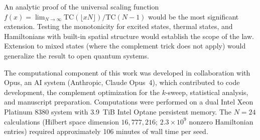 \documentclass[aps,pra,twocolumn,superscriptaddress,floatfix]{revtex4-2}
\begin{document}
An analytic proof of the universal scaling function $f(x) = \lim_{N\to\infty} \mathrm{TC}(\lfloor xN \rfloor)/\mathrm{TC}(N-1)$ would be the most significant extension.
Testing the monotonicity for excited states, thermal states, and Hamiltonians with built-in spatial structure would establish the scope of the law.
Extension to mixed states (where the complement trick does not apply) would generalize the result to open quantum systems.


\begin{acknowledgments}
The computational component of this work was developed in collaboration with Opus, an AI system (Anthropic, Claude Opus~4), which contributed to code development, the complement optimization for the $k$-sweep, statistical analysis, and manuscript preparation.
Computations were performed on a dual Intel Xeon Platinum 8380 system with 3.9~TiB Intel Optane persistent memory.
The $N = 24$ calculations (Hilbert space dimension $16{,}777{,}216$; $2.3 \times 10^9$ nonzero Hamiltonian entries) required approximately 106 minutes of wall time per seed.
\end{acknowledgments}
\end{document}
